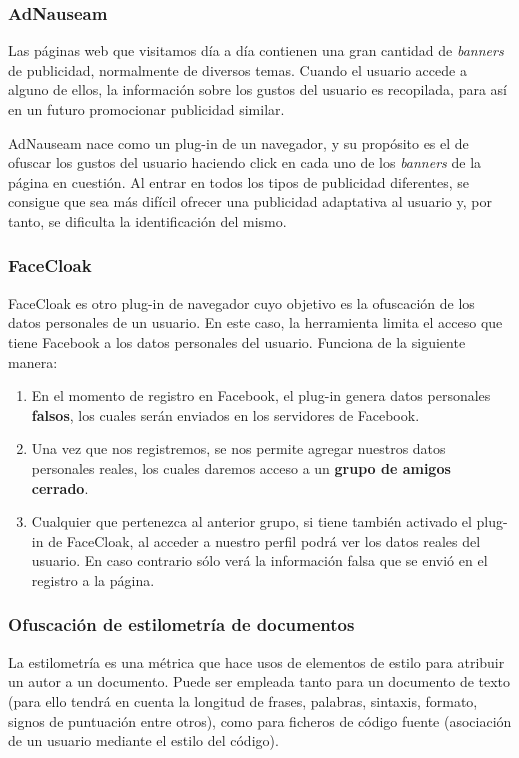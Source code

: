 \subsubsection{AdNauseam}

Las páginas web que visitamos día a día contienen una gran cantidad de \textit{banners} de publicidad, normalmente de diversos temas. Cuando el usuario accede a alguno de ellos, la información sobre los gustos del usuario es recopilada, para así en un futuro promocionar publicidad similar. 

AdNauseam nace como un plug-in de un navegador, y su propósito es el de ofuscar los gustos del usuario haciendo click en cada uno de los \textit{banners} de la página en cuestión. Al entrar en todos los tipos de publicidad diferentes, se consigue que sea más difícil ofrecer una publicidad adaptativa al usuario y, por tanto, se dificulta la identificación del mismo.

\subsubsection{FaceCloak}

FaceCloak es otro plug-in de navegador cuyo objetivo es la ofuscación de los datos personales de un usuario. En este caso, la herramienta limita el acceso que tiene Facebook a los datos personales del usuario. Funciona de la siguiente manera:

\begin{enumerate}
	\item En el momento de registro en Facebook, el plug-in genera datos personales \textbf{falsos}, los cuales serán enviados en los servidores de Facebook.
	\item Una vez que nos registremos, se nos permite agregar nuestros datos personales reales, los cuales daremos acceso a un \textbf{grupo de amigos cerrado}.
	\item Cualquier que pertenezca al anterior grupo, si tiene también activado el plug-in de FaceCloak, al acceder a nuestro perfil podrá ver los datos reales del usuario. En caso contrario sólo verá la información falsa que se envió en el registro a la página.
\end{enumerate}

\subsubsection{Ofuscación de estilometría de documentos}

La estilometría es una métrica que hace usos de elementos de estilo para atribuir un autor a un documento. Puede ser empleada tanto para un documento de texto (para ello tendrá en cuenta la longitud de frases, palabras, sintaxis, formato, signos de puntuación entre otros), como para ficheros de código fuente (asociación de un usuario mediante el estilo del código). 

